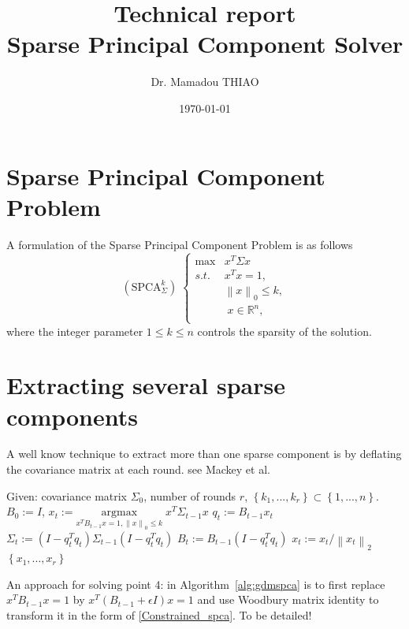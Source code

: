 \documentclass[fleqn]{report} %
\title{Technical report\\Sparse Principal Component Solver} %
\author{Dr. Mamadou THIAO} %
\date{\today} %
\begin{document}
    \maketitle %
    \tableofcontents
    \section{Sparse Principal Component Problem} %
A formulation of the Sparse Principal Component Problem is as follows
\begin{equation}
		\label{Constrained_spca}
		(\text{SPCA}_{\Sigma}^{k})\;
		\left\{
		\begin{array}{ll}\max & x^{T}\Sigma x\\
			s.t.&x^{T}x = 1,\\
			&\left\|x\right\|_0 \leq k,\\
			&\;x\in\mathbb{R}^n,\\
		\end{array} 
		\right.
    \end{equation}
		where the integer parameter $1 \leq k\leq n $ controls the sparsity of the solution.
    \section{Extracting several sparse components} %
A well know technique to extract more than one sparse component is by deflating the covariance matrix at each round. see Mackey et al.
\begin{algorithm}[H]
        \caption{Generalized Deflation Method for Sparse PCA}
        \label{alg:gdmspca}
        \begin{algorithmic}[1] %
	  \State Given: covariance matrix  $\Sigma_0$, number of rounds $r$, $\left\{k_1,...,k_r\right\}\subset\left\{1, ..., n\right\}$.
	\State $B_0 := I$,
		\State $x_t := \underset{x^{T}B_{t-1}x = 1, \left\|x\right\|_0 \leq k}{\text{argmax}}\; x^{T}\Sigma_{t-1} x$
		\State  $q_t :=B_{t-1}x_t$
		\State $\Sigma_{t} := (I-q_t^{T}q_t)\Sigma_{t-1}(I-q_t^{T}q_t)$
		\State $B_{t} := B_{t-1}(I-q_t^{T}q_t)$
		\State $x_{t} := x_{t} \slash\left\| x_{t}\right\|_2$
	 \EndFor
            \State \Return $\left\{x_1,...,x_r\right\}$
        \end{algorithmic}
    \end{algorithm}
An approach for solving point 4: in Algorithm~\ref{alg:gdmspca} is to first replace $x^{T}B_{t-1}x = 1$ by $x^{T}(B_{t-1} + \epsilon I)x = 1$ and use Woodbury matrix identity to transform it in the form of \ref{Constrained_spca}. To be detailed!
\end{document}
